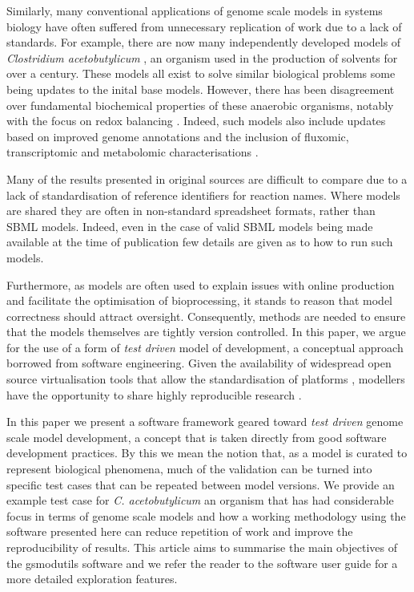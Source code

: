 \documentclass[a4paper,10pt]{article}
\begin{document}
Similarly, many conventional applications of genome scale models in systems biology have often suffered from unnecessary replication of work due to a lack of standards.
For example, there are now many independently developed models of \textit{Clostridium acetobutylicum} \cite{lee2008genome, senger2008genome, mcanulty2012genome, dash2014capturing, yoo2015quantitative}, an organism used in the production of solvents for over a century.
These models all exist to solve similar biological problems some being updates to the inital base models. 
However, there has been disagreement over fundamental biochemical properties of these anaerobic organisms, notably with the focus on redox balancing \cite{dash2014capturing}.
Indeed, such models also include updates based on improved genome annotations and the inclusion of fluxomic, transcriptomic and metabolomic characterisations \cite{yoo2015quantitative}.

Many of the results presented in original sources are difficult to compare due to a lack of standardisation of reference identifiers for reaction names.
Where models are shared they are often in non-standard spreadsheet formats, rather than SBML models.
Indeed, even in the case of valid SBML models being made available at the time of publication few details are given as to how to run such models.

Furthermore, as models are often used to explain issues with online production and facilitate the optimisation of bioprocessing, it stands to reason that model correctness should attract oversight.
Consequently, methods are needed to ensure that the models themselves are tightly version controlled.
In this paper, we argue for the use of a form of \textit{test driven} model of development, a conceptual approach borrowed from software engineering.
Given the availability of widespread open source virtualisation tools that allow the standardisation of platforms \cite{merkel2014docker}, modellers have the opportunity to share highly reproducible research \cite{chamberlain2014using}.

In this paper we present a software framework geared toward \textit{test driven} genome scale model development, a concept that is taken directly from good software development practices.
By this we mean the notion that, as a model is curated to represent biological phenomena, much of the validation can be turned into specific test cases that can be repeated between model versions.
We provide an example test case for \textit{C. acetobutylicum} an organism that has had considerable focus in terms of genome scale models and how a working methodology using the software presented here can reduce repetition of work and improve the reproducibility of results.
This article aims to summarise the main objectives of the gsmodutils software and we refer the reader to the software user guide for a more detailed exploration features.
\end{document}
